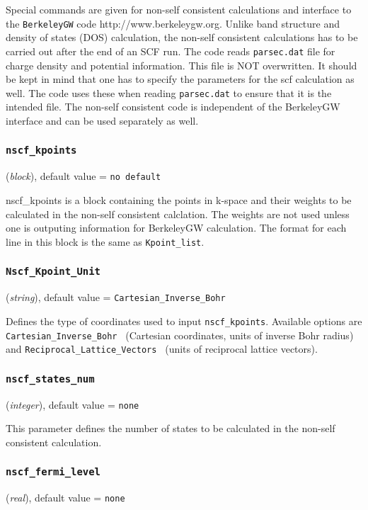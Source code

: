 \documentclass{article}
\begin{document}
Special commands are given for non-self consistent calculations and interface
to the {\tt BerkeleyGW} code {http://www.berkeleygw.org}. Unlike
band structure and density of states (DOS) calculation, the non-self consistent
calculations has to be carried out after the end of an SCF run. The code
reads {\tt parsec.dat} file for charge density and potential information.
This file is NOT overwritten.  It should be kept in mind that one has to 
specify the parameters for the scf calculation as well. The code uses 
these when reading {\tt parsec.dat} to ensure that it is the intended
file. The non-self consistent code is independent of the BerkeleyGW interface
and can be used separately as well. 
 
\subsubsection{\tt nscf\_kpoints
\label{nscfkpoints}}
({\it block}),
default value = {\tt no default }

nscf\_kpoints is a block containing the points in k-space and their weights
to be calculated in the non-self consistent calclation. The weights are not 
used unless one is outputing information for BerkeleyGW calculation. The format
for each line in this block is the same as {\tt Kpoint\_list}.

\subsubsection{\tt Nscf\_Kpoint\_Unit
\label{NscfKpointUnit}}
({\it string}),
default value = {\tt Cartesian\_Inverse\_Bohr }

Defines the type of coordinates used to input {\tt nscf\_kpoints}. Available
options are {\tt Cartesian\_Inverse\_Bohr } (Cartesian coordinates,
units of inverse Bohr radius) and {\tt Reciprocal\_Lattice\_Vectors }
(units of reciprocal lattice vectors).

\subsubsection{\tt nscf\_states\_num
\label{nscfstatesnum}}
({\it integer}),
default value = {\tt none }

This parameter defines the number of states to be calculated in the 
non-self consistent calculation.

\subsubsection{\tt nscf\_fermi\_level
\label{nscffermilevel}}
({\it real}),
default value = {\tt none}
\end{document}
